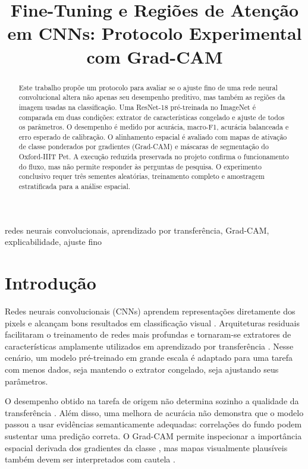 \documentclass[conference]{IEEEtran}
\title{Fine-Tuning e Regiões de Atenção em CNNs: Protocolo Experimental com Grad-CAM}
\author{%
\IEEEauthorblockN{Eduardo Jesus Dal Pizzol e Matheus Lemes Amaral}
\IEEEauthorblockA{Universidade de Brasília (UnB)\\
FGA0261 - Inteligência Artificial II\\
Matrículas: 251008114 e 241031852}}
\begin{document}
\maketitle

\begin{abstract}
Este trabalho propõe um protocolo para avaliar se o ajuste fino de uma rede neural convolucional altera não apenas seu desempenho preditivo, mas também as regiões da imagem usadas na classificação. Uma ResNet-18 pré-treinada no ImageNet é comparada em duas condições: extrator de características congelado e ajuste de todos os parâmetros. O desempenho é medido por acurácia, macro-F1, acurácia balanceada e erro esperado de calibração. O alinhamento espacial é avaliado com mapas de ativação de classe ponderados por gradientes (Grad-CAM) e máscaras de segmentação do Oxford-IIIT Pet. A execução reduzida preservada no projeto confirma o funcionamento do fluxo, mas não permite responder às perguntas de pesquisa. O experimento conclusivo requer três sementes aleatórias, treinamento completo e amostragem estratificada para a análise espacial.
\end{abstract}

\begin{IEEEkeywords}
redes neurais convolucionais, aprendizado por transferência, Grad-CAM, explicabilidade, ajuste fino
\end{IEEEkeywords}

\section{Introdução}

Redes neurais convolucionais (CNNs) aprendem representações diretamente dos pixels e alcançam bons resultados em classificação visual \cite{krizhevsky2012imagenet}. Arquiteturas residuais facilitaram o treinamento de redes mais profundas e tornaram-se extratores de características amplamente utilizados em aprendizado por transferência \cite{he2016deep}. Nesse cenário, um modelo pré-treinado em grande escala é adaptado para uma tarefa com menos dados, seja mantendo o extrator congelado, seja ajustando seus parâmetros.

O desempenho obtido na tarefa de origem não determina sozinho a qualidade da transferência \cite{kornblith2019better}. Além disso, uma melhora de acurácia não demonstra que o modelo passou a usar evidências semanticamente adequadas: correlações do fundo podem sustentar uma predição correta. O Grad-CAM permite inspecionar a importância espacial derivada dos gradientes da classe \cite{selvaraju2017gradcam}, mas mapas visualmente plausíveis também devem ser interpretados com cautela \cite{adebayo2018sanity}.
\end{document}

